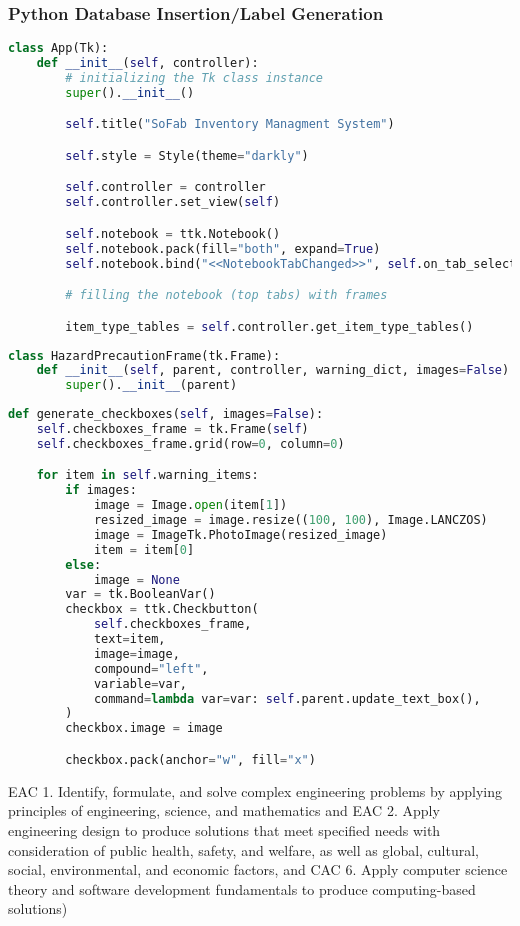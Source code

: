 \documentclass{article}
\begin{document}
\FloatBarrier
\subsubsection{Python Database Insertion\slash Label Generation}
\begin{lstlisting}[language=Python]
class App(Tk):
    def __init__(self, controller):
        # initializing the Tk class instance
        super().__init__()

        self.title("SoFab Inventory Managment System")

        self.style = Style(theme="darkly")

        self.controller = controller
        self.controller.set_view(self)

        self.notebook = ttk.Notebook()
        self.notebook.pack(fill="both", expand=True)
        self.notebook.bind("<<NotebookTabChanged>>", self.on_tab_selection)

        # filling the notebook (top tabs) with frames

        item_type_tables = self.controller.get_item_type_tables()
\end{lstlisting}
\begin{lstlisting}[language=Python]
class HazardPrecautionFrame(tk.Frame):
    def __init__(self, parent, controller, warning_dict, images=False):
        super().__init__(parent)
\end{lstlisting}
\begin{lstlisting}[language=Python]
def generate_checkboxes(self, images=False):
    self.checkboxes_frame = tk.Frame(self)
    self.checkboxes_frame.grid(row=0, column=0)

    for item in self.warning_items:
        if images:
            image = Image.open(item[1])
            resized_image = image.resize((100, 100), Image.LANCZOS)
            image = ImageTk.PhotoImage(resized_image)
            item = item[0]
        else:
            image = None
        var = tk.BooleanVar()
        checkbox = ttk.Checkbutton(
            self.checkboxes_frame,
            text=item,
            image=image,
            compound="left",
            variable=var,
            command=lambda var=var: self.parent.update_text_box(),
        )
        checkbox.image = image

        checkbox.pack(anchor="w", fill="x")
\end{lstlisting}

EAC 1. Identify, formulate, and solve complex engineering problems by 
applying principles of engineering, science, and mathematics and EAC 2. 
Apply engineering design to produce solutions that meet specified needs with 
consideration of public health, safety, and welfare, as well as global, cultural, 
social, environmental, and economic factors, and CAC 6. Apply computer 
science theory and software development fundamentals to produce 
computing-based solutions) 
\end{document}
